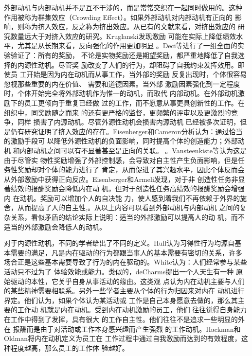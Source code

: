 \documentclass[12pt,a4paper]{ctexart}
\begin{document}
外部动机与内部动机并不是互不干涉的，而是常常交织在一起同时做用的。这种
作用被称为群集效应（Crowding Effect）。如果外部动机对内部动机有正向的
影响，则称为挤入效应，反之称为挤出效应。从已有的文献来看，对挤出效应的
研究数量远大于对挤入效应的研究。Kruglanski发现激励
可能在实际上降低绩效水平，尤其是从长期来看，反向强化的作用更加明显
\cite{Kruglanski1978}。Deci等进行了一组全面的实验验证了：所有的奖励，
不论是实物奖励还是期望奖励，都严重地降低了自我选择的内源性动机。尽管奖
励改变了人们的行为，却阻碍了自我约束发挥效用\cite{deci1999mar}。即使员
工开始是因为内在动机而从事工作，当外部的奖励
反复出现时，个体很容易忽视那些重要的内在价值、
需要和道德因素\cite{deci2000agp}。当外部
激励因素强化到一定程度时，个体开始完全将外部动机作为惟一的动机，而取代
内部动机\cite{kasser2002hpm}。在外部动机激励下的员工更倾向于重复已经做
过的工作，而不愿意从事更具创新性的工作\cite{amabile1998kc}\cite{schwartz1993cad}。在组织中，同奖励随之而来
的还有更严格的监督，更频繁的评审以及更激烈的竞争\cite{Kohn1993}，同样
损害了内源动机\cite{deci1985ima}。尽管外源性动机会损害内源动机
已经被多次证明，但是仍有研究证明了挤入效应的存在。Eisenberger和Cameron分析认为：通过恰当的激励手段可
以降低外源性动机的负面影响，同时提高个体的创造能力；外部动机
和内部动机之间可以有不显著甚至是正向的关联。
\cite{eisenberger1996der}。Vansteenkiste等认为这是由于尽管实
物性奖励增强了外部控制感，会导致对自主性产生负面影响，但是任务性奖励却对个体的能力进行了
肯定，从而促进了其兴趣水平，因此个体反而会从外部激励中获得正向反应\cite{vansteenkiste2003ccr}。Eisenberger和Armeli发现，对于非
创造性任务非显著绩效的报酬奖励会降低内在动
机，但对于创造性任务高绩效的报酬奖励会增强内
在动机\cite{eisenberger1997csr}。奖励可以增加个人的自决能
力，使人感到着我们不再依赖于外界的施舍，从而提高了人的自主性\cite{eisenberger1999dpp},\cite{eisenberger1999eri}。从以上内容可以看到外部动机与内部动机
之间的复杂关系，看似矛盾的结论实际上说明：适当的外部激励可以提高人的动
机，而不适当的外部激励会降低人的动机。



对于内源性动机，不同的学者给出了不同的定义。Hull认为习得性行为均源自基
本需要的满足，凡是内在驱动的行为都跟当事人的基本需要有密切的关系，许多
场合正是这些基本需要导致了行为的内在驱动的\cite{hull1943pbi}。White认为：人们经常参与某些活动只不过为了
体验效能或能力\cite{white66wmr}。类似的，deCharms提出一个人天生有一种
原始驱动的本性，它关乎自身从事活动的缘由\cite{decharms1968pci}。这类观
点认为内在动机主要与人们的某些精神需要相联系\cite{Kanfer1990}。另外一些学者主要从个体的行为归因来对内在
动机进行界定。他们认为，如果个体认为某活动或
工作是自己本身愿意去做的，那么其主要的工作动
机就是内在动机。受到内在动机激励的员工，他们
往往觉得自身能力在工作中得到了发挥，具有很大
的工作自主性。他们往往不是追求一些明显的外在
报酬而是由于对活动或工作本身感兴趣而产生强烈
的工作动机\cite{chenandwu2008}。Hackman和Oldman将内在动机定义为员工在
工作过程中通过自我激励而达到的有效程度，这种程度越高，那么员工的工作体
验越好\cite{hackman1975djd}。
\end{document}
